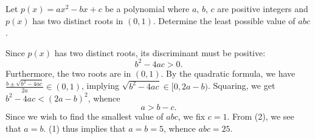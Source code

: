 \begin{question}[25]\label{A::2021-O-1-20}
    Let $p(x) = ax^2 - bx + c$ be a polynomial where $a$, $b$, $c$ are positive integers and $p(x)$ has two distinct roots in $(0, 1)$. Determine the least possible value of $abc$.
\end{question}
\begin{solution*}
    Since $p(x)$ has two distinct roots, its discriminant must be positive: \[b^2 - 4ac > 0. \tag{1}\] Furthermore, the two roots are in $(0, 1)$. By the quadratic formula, we have $\frac{b \pm \sqrt{b^2 - 4ac}}{2a} \in (0, 1)$, implying $\sqrt{b^2 - 4ac} \in [0, 2a-b)$. Squaring, we get $b^2 - 4ac < (2a-b)^2$, whence \[a > b - c.\tag{2}\] Since we wish to find the smallest value of $abc$, we fix $c = 1$. From (2), we see that $a = b$. (1) thus implies that $a = b = 5$, whence $abc = 25$.
\end{solution*}

